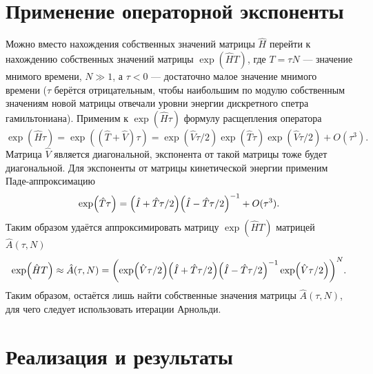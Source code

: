 \documentclass[10pt]{article}
\begin{document}
\section{Применение операторной экспоненты}

Можно вместо нахождения собственных значений матрицы $\hat H$ перейти к нахождению собственных значе\-ний матрицы $\exp(\hat H T)$, где $T = \tau N$ --- значение мнимого времени, $N\gg1$, а $\tau<0$ --- достаточно малое значение мнимого времени ($\tau$ берётся отрицательным, чтобы наибольшим по модулю собственным значениям новой матрицы отвечали уровни энергии дискретного спетра гамильтониана). Применим к $\exp(\hat H \tau)$ формулу расщепления оператора
\begin{equation}
 \exp(\hat H \tau) = \exp((\hat T + \hat V) \tau) = \exp(\hat V \tau/2) \exp(\hat T \tau) \exp(\hat V \tau/2) + O(\tau^3).
\end{equation}
Матрица $\hat V$ является диагональной, экспонента от такой матрицы тоже будет диагональной. Для экспонен\-ты от матрицы кинетической энергии применим Паде-аппроксимацию
\begin{equation}
 \exp(\hat T \tau) = \qty(\hat I + \hat T \tau/2) \qty(\hat I - \hat T \tau/2)^{-1} + O(\tau^3).
\end{equation}
Таким образом удаётся аппроксимировать матрицу $\exp(\hat H T)$ матрицей $\hat A(\tau, N)$
\begin{equation}
 \exp(\hat H T) \approx \hat A(\tau, N) = \qty(\exp(\hat V \tau/2) \qty(\hat I + \hat T \tau/2) \qty(\hat I - \hat T \tau/2)^{-1} \exp(\hat V \tau/2) )^N.
\end{equation}
Таким образом, остаётся лишь найти собственные значения матрицы $\hat A(\tau, N)$, для чего следует использо\-вать итерации Арнольди.

\section{Реализация и результаты}
\end{document}
